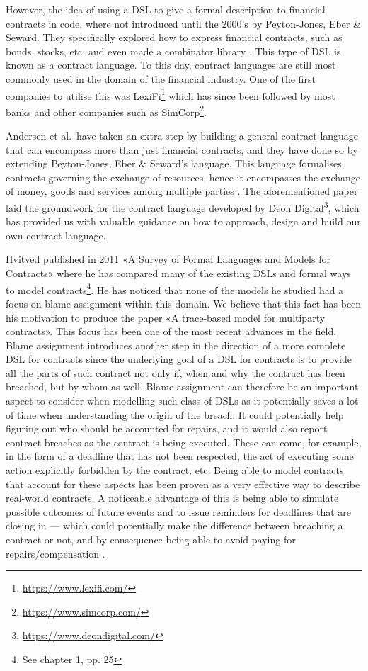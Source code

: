 \documentclass{ituthesis}
\begin{document}
However, the idea of using a DSL to give a formal description to financial contracts in code, where not introduced until the 2000's by Peyton-Jones, Eber \& Seward. They specifically explored how to express financial contracts, such as bonds, stocks, etc. and even made a combinator library \cite{peyton2000composing}. This type of DSL is known as a contract language. To this day, contract languages are still most commonly used in the domain of the financial industry. One of the first companies to utilise this was LexiFi\footnote{\url{https://www.lexifi.com/}} which has since been followed by most banks and other companies such as SimCorp\footnote{\url{https://www.simcorp.com/}}.

Andersen et al.\ have taken an extra step by building a general contract language that can encompass more than just financial contracts, and they have done so by extending Peyton-Jones, Eber \& Seward's language. This language formalises contracts governing the exchange of resources, hence it encompasses the exchange of money, goods and services among multiple parties \cite{andersen2006compositional}. The aforementioned paper laid the groundwork for the contract language developed by Deon Digital\footnote{\url{https://www.deondigital.com/}}, which has provided us with valuable guidance on how to approach, design and build our own contract language.

Hvitved published in 2011 «A Survey of Formal Languages and Models for Contracts» where he has compared many of the existing DSLs and formal ways to model contracts\footnote{See \cite{hvitved2011contract} chapter 1, pp. 25}. He has noticed that none of the models he studied had a focus on blame assignment within this domain. We believe that this fact has been his motivation to produce the paper «A trace-based model for multiparty contracts». This focus has been one of the most recent advances in the field. Blame assignment introduces another step in the direction of a more complete DSL for contracts since the underlying goal of a DSL for contracts is to provide all the parts of such contract not only if, when and why the contract has been breached, but by whom as well. Blame assignment can therefore be an important aspect to consider when modelling such class of DSLs as it potentially saves a lot of time when understanding the origin of the breach. It could potentially help figuring out who should be accounted for repairs, and it would also report contract breaches as the contract is being executed. These can come, for example, in the form of a deadline that has not been respected, the act of executing some action explicitly forbidden by the contract, etc. Being able to model contracts that account for these aspects has been proven as a very effective way to describe real-world contracts. A noticeable advantage of this is being able to simulate possible outcomes of future events and to issue reminders for deadlines that are closing in --- which could potentially make the difference between breaching a contract or not, and by consequence being able to avoid paying for repairs/compensation \cite{hvitved2012trace}.
\end{document}
